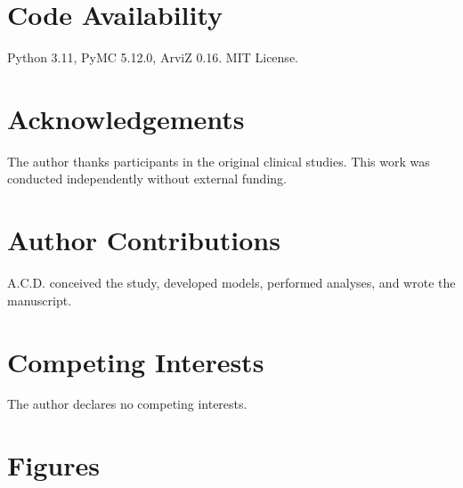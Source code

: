 \documentclass[10pt,a4paper]{article}
\begin{document}
\section*{Code Availability}

Python 3.11, PyMC 5.12.0, ArviZ 0.16. MIT License.

\section*{Acknowledgements}

The author thanks participants in the original clinical studies. This work was conducted independently without external funding.

\section*{Author Contributions}

A.C.D. conceived the study, developed models, performed analyses, and wrote the manuscript.

\section*{Competing Interests}

The author declares no competing interests.

\section*{Figures}
\end{document}
